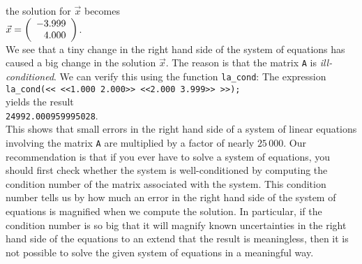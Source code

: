 the solution for $\vec{x}$ becomes
\\[0.2cm]
\hspace*{1.3cm}
$\vec{x}  = 
 \left(
   \begin{array}[c]{r}
     -3.999 \\ 4.000
   \end{array}
  \right)
$.
\\[0.2cm]
We see that a tiny change in the right hand side of the system of equations has caused a big change
in the solution $\vec{x}$.  The reason is that the matrix \texttt{A} is \emph{ill-conditioned}.
We can verify this using the function \texttt{la\_cond}:  The expression
\\[0.2cm]
\hspace*{1.3cm}
\texttt{la\_cond(<< <<1.000 2.000>> <<2.000 3.999>> >>);}
\\[0.2cm]
yields the result 
\\[0.2cm]
\hspace*{1.3cm}
\texttt{24992.000959995028}.
\\[0.2cm]
This shows that small errors in the right hand side of a system of linear equations involving the
matrix \texttt{A} are multiplied by a factor of nearly $25\,000$.  Our recommendation is that if you
ever have to solve a system of equations, you should first check whether the system is
well-conditioned by computing the condition number of the matrix associated with the system.  This 
condition number tells us by how much an error in the right hand side of the system of equations is
magnified when we compute the solution.  In particular, if the condition number is so big that it
will magnify known uncertainties in  the right hand side of the equations to an extend that the
result is meaningless, then it is not possible to solve the given system of equations in a meaningful
way. 


